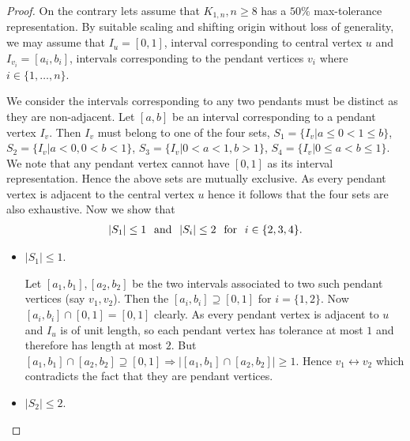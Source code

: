 \documentclass{article}
\theoremstyle{definition}
\numberwithin{equation}{section}
\begin{document}
\begin{proof}
\noindent
On the contrary lets assume that $K_{1,n}, n\geq 8$ has a $50\%$ max-tolerance representation. By suitable scaling and shifting origin without loss of generality, we may assume that $I_{u}=[0,1]$, interval corresponding to central vertex $u$ and $I_{v_{i}}=[a_{i},b_{i}]$, intervals corresponding to the pendant vertices $v_{i}$ where $i\in\{1,\hdots,n\}$.

\noindent We consider the intervals corresponding to any two pendants must be distinct as they are non-adjacent.
Let $[a,b]$ be an interval corresponding to a pendant vertex $I_{v}$.  Then $I_{v}$ must belong to one of the four sets, $S_{1}=\{I_{v}|a\leq 0<1\leq b\}$, $S_{2}=\{I_{v}|a<0,0<b< 1\}$, $S_{3}=\{I_{v}|0<a<1,b>1\}$, $S_{4}=\{I_{v}|0\leq a< b\leq 1\}$. We note that any pendant vertex cannot have $[0,1]$ as its interval representation. Hence the above sets are mutually exclusive. As every pendant vertex is adjacent to the central vertex $u$ hence it follows that the four sets are also exhaustive. 
Now we show that
\begin{eqnarray} \label{50}
|S_{1}|\leq 1 \hspace*{.7em}\text{and} \hspace*{.7em} |S_{i}|\leq 2 \hspace*{.7em} \text{for} \hspace*{.7em} i\in\{2,3,4\}.
\end{eqnarray}


\begin{itemize}
\item $|S_{1}|\leq 1$.

\vspace{.1em}\noindent
Let $[a_{1},b_{1}],[a_{2},b_{2}]$ be the two intervals associated to two such pendant vertices
(say $v_{1},v_{2}$). Then the  $[a_{i},b_{i}] \supseteq [0,1]$ for $i=\{1,2\}.$ Now $[a_{i},b_{i}]\cap[0,1]=[0,1]$ clearly. As every pendant vertex is adjacent to $u$ and $I_{u}$ is of unit length, so each pendant vertex has tolerance at most $1$ and therefore has length at most $2$. But $[a_{1},b_{1}]\cap [a_{2},b_{2}]\supseteq [0,1]\Rightarrow |[a_{1},b_{1}]\cap [a_{2},b_{2}]|\geq 1$. Hence $v_{1}\leftrightarrow v_{2}$ which contradicts the fact that they are pendant vertices.

\item $|S_{2}|\leq 2$.


\end{itemize}
\end{proof}
\end{document}
